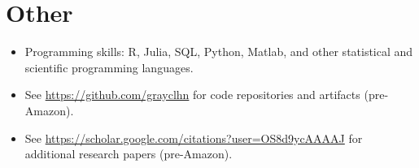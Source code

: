 \documentclass[10pt]{safecv}%
\begin{document}
\section*{Other}

\begin{itemize}[noitemsep]
\item Programming skills: R, Julia, SQL, Python, Matlab, and other statistical and scientific
  programming languages.
\item See \url{https://github.com/grayclhn} for code repositories and artifacts (pre-Amazon).
\item See \url{https://scholar.google.com/citations?user=OS8d9ycAAAAJ} for additional research papers (pre-Amazon).
\end{itemize}
\end{document}
